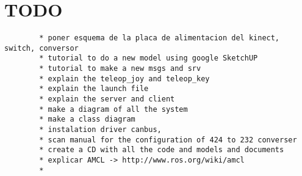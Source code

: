 \documentclass[11pt,a4paper]{report}	%
\begin{document}
		

		\pagestyle{zardoz}
		
		\textheight 24cm
		\textwidth 16cm
		\oddsidemargin 8mm
		\topmargin -15mm
		\headheight 1cm
		\headsep 1cm


		\setcounter{page}{1}
		\tableofcontents																																   



		\pagebreak
    \setcounter{page}{1}																										
    	\chapter*{TODO}
		\begin{verbatim}
		* poner esquema de la placa de alimentacion del kinect, switch, conversor
		* tutorial to do a new model using google SketchUP
		* tutorial to make a new msgs and srv
		* explain the teleop_joy and teleop_key
		* explain the launch file
		* explain the server and client
		* make a diagram of all the system
		* make a class diagram
		* instalation driver canbus,
		* scan manual for the configuration of 424 to 232 converser
		* create a CD with all the code and models and documents
		* explicar AMCL -> http://www.ros.org/wiki/amcl
		* 
		\end{verbatim}    
    
    		
		
		
		
		
		
\end{document}
